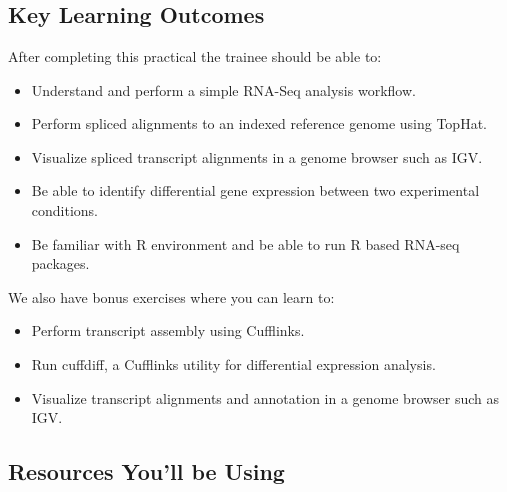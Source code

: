
\chapter{\moduleTitle}
\newpage

\section{Key Learning Outcomes}

After completing this practical the trainee should be able to:
\begin{itemize}
  \item Understand and perform a simple RNA-Seq analysis workflow.
  \item Perform spliced alignments to an indexed reference genome using TopHat.
  \item  Visualize spliced transcript alignments in a genome browser such as IGV.
  \item Be able to identify differential gene expression between two experimental conditions.
  \item Be familiar with R environment and be able to run R based RNA-seq packages.
\end{itemize}

We also have bonus exercises where you can learn to:
\begin{itemize}
  \item Perform transcript assembly using Cufflinks.
  \item Run cuffdiff, a Cufflinks utility for differential expression analysis.
  \item Visualize transcript alignments and annotation in a genome browser such as IGV.
\end{itemize}

\section{Resources You'll be Using}
 

